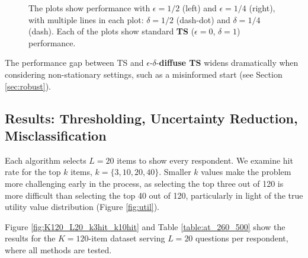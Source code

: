 \documentclass[nonblindrev]{informs3}
\newcommand{\ts}{\textbf{TS} }
\newcommand{\edts}{$\epsilon$-$\delta$-\textbf{diffuse TS} }
\newcommand{\numperset}{L}
\begin{document}
\begin{figure}
\caption{The plots show performance with $\epsilon = 1/2$ (left) and $\epsilon = 1/4$ (right), with multiple lines in each plot: $\delta = 1/2$ (dash-dot) and $\delta = 1/4$ (dash). Each of the plots show standard \ts ($\epsilon = 0$, $\delta =1$) performance.}
\label{fig:effects_epsilon_delta}
 	\begin{center}
    \qquad
    \end{center}
\end{figure}

The performance gap between TS and \edts widens dramatically when considering non-stationary settings, such as a misinformed start (see Section \ref{sec:robust}). 

\subsection{Results: Thresholding, Uncertainty Reduction, Misclassification}

Each algorithm selects $\numperset=20$ items to show every respondent. We examine hit rate for the top $k$ items, $k = \{3,10,20,40\}$. Smaller $k$ values make the problem more challenging early in the process, as selecting the top three out of 120 is more difficult than selecting the top 40 out of 120, particularly in light of the true utility value distribution (Figure \ref{fig:util}).  


Figure \ref{fig:K120_L20_k3hit_k10hit} and Table \ref{table:at_260_500} show the results for the $K=120$-item dataset serving $\numperset=20$ questions per respondent, where all methods are tested.
\end{document}
